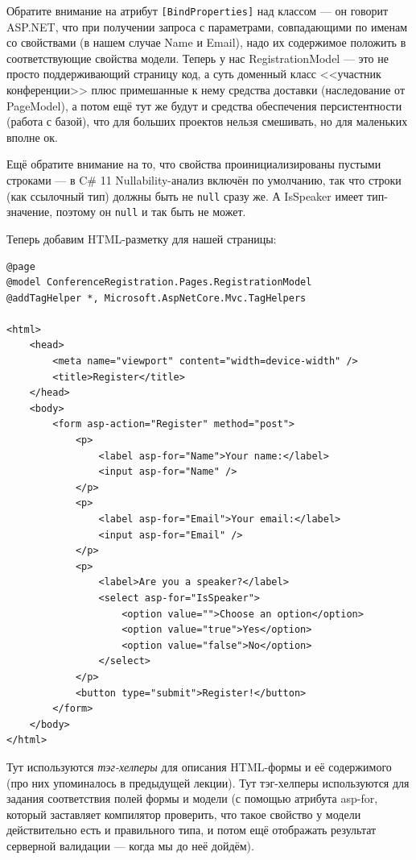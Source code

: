\documentclass{../../text-style}
\begin{document}
Обратите внимание на атрибут \texttt{[BindProperties]} над классом --- он говорит ASP.NET, что при получении запроса с параметрами, совпадающими по именам со свойствами (в нашем случае Name и Email), надо их содержимое положить в соответствующие свойства модели. Теперь у нас RegistrationModel --- это не просто поддерживающий страницу код, а суть доменный класс <<участник конференции>> плюс примешанные к нему средства доставки (наследование от PageModel), а потом ещё тут же будут и средства обеспечения персистентности (работа с базой), что для больших проектов нельзя смешивать, но для маленьких вполне ок.

Ещё обратите внимание на то, что свойства проинициализированы пустыми строками --- в C\# 11 Nullability-анализ включён по умолчанию, так что строки (как ссылочный тип) должны быть не \texttt{null} сразу же. А IsSpeaker имеет тип-значение, поэтому он \texttt{null} и так быть не может.

Теперь добавим HTML-разметку для нашей страницы:

\begin{verbatim}
@page
@model ConferenceRegistration.Pages.RegistrationModel
@addTagHelper *, Microsoft.AspNetCore.Mvc.TagHelpers

<html>
    <head>
        <meta name="viewport" content="width=device-width" />
        <title>Register</title>
    </head>
    <body>
        <form asp-action="Register" method="post">
            <p>
                <label asp-for="Name">Your name:</label>
                <input asp-for="Name" />
            </p>
            <p>
                <label asp-for="Email">Your email:</label>
                <input asp-for="Email" />
            </p>
            <p>
                <label>Are you a speaker?</label>
                <select asp-for="IsSpeaker">
                    <option value="">Choose an option</option>
                    <option value="true">Yes</option>
                    <option value="false">No</option>
                </select>
            </p>
            <button type="submit">Register!</button>
        </form>
    </body>
</html>
\end{verbatim}

Тут используются \emph{тэг-хелперы} для описания HTML-формы и её содержимого (про них упоминалось в предыдущей лекции). Тут тэг-хелперы используются для задания соответствия полей формы и модели (с помощью атрибута asp-for, который заставляет компилятор проверить, что такое свойство у модели действительно есть и правильного типа, и потом ещё отображать результат серверной валидации --- когда мы до неё дойдём).
\end{document}
